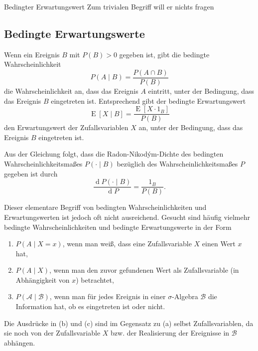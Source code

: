 \begin{info}{Bedingter Erwartungswert}
    Zum trivialen Begriff will er nichts fragen
\end{info}

\subsection{Bedingte Erwartungswerte}

Wenn ein Ereignis $B$ mit $P(B) > 0$ gegeben ist, gibt die bedingte Wahrscheinlichkeit
\[
    P(A \mid B) = \frac{P(A \cap B)}{P(B)}
\]
die Wahrscheinlichkeit an, dass das Ereignis $A$ eintritt, unter der Bedingung, dass das Ereignis $B$ eingetreten ist.
Entsprechend gibt der bedingte Erwartungswert
\[
    \operatorname{E} [X \mid B] = \frac{\operatorname{E} [X \cdot 1_B]}{P(B)}
\]
den Erwartungswert der Zufallsvariablen $X$ an, unter der Bedingung, dass das Ereignis $B$ eingetreten ist.

Aus der Gleichung folgt, dass die Radon-Nikodým-Dichte des bedingten Wahrscheinlichkeitsmaßes $P(\cdot \mid B)$ bezüglich des Wahrscheinlichkeitsmaßes $P$ gegeben ist durch
\[
    \frac{\operatorname{d} P(\cdot \mid B)}{\operatorname{d} P} = \frac{1_B}{P(B)}.
\]

Dieser elementare Begriff von bedingten Wahrscheinlichkeiten und Erwartungswerten ist jedoch oft nicht ausreichend. Gesucht sind häufig vielmehr bedingte Wahrscheinlichkeiten und bedingte Erwartungswerte in der Form
\begin{enumerate}[label=(\alph*)]
    \item $P(A \mid X = x)$, wenn man weiß, dass eine Zufallsvariable $X$ einen Wert $x$ hat,
    \item $P(A \mid X)$, wenn man den zuvor gefundenen Wert als Zufallsvariable (in Abhängigkeit von $x$) betrachtet,
    \item $P(\mathcal{A} \mid \mathcal{B})$, wenn man für jedes Ereignis in einer $\sigma$-Algebra $\mathcal{B}$ die Information hat, ob es eingetreten ist oder nicht.
\end{enumerate}

Die Ausdrücke in (b) und (c) sind im Gegensatz zu (a) selbst Zufallsvariablen, da sie noch von der Zufallsvariable $X$ bzw. der Realisierung der Ereignisse in $\mathcal{B}$ abhängen.

